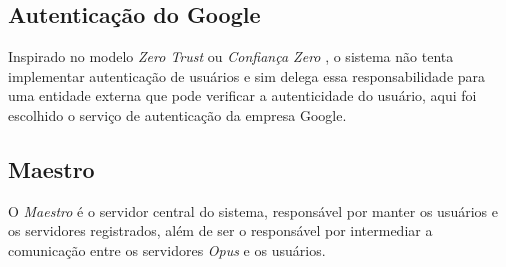 \subsection{Autenticação do Google}
\label{arq-subsubsec:internet-autenticacao-google}
Inspirado no modelo \emph{Zero Trust} ou \emph{Confiança Zero} \cite{Kang2023}, o sistema não tenta implementar autenticação de usuários
e sim delega essa responsabilidade para uma entidade externa que pode verificar a autenticidade do usuário, 
aqui foi escolhido o serviço de autenticação da empresa Google.

\subsection{Maestro}
\label{arq-subsubsec:internet-maestro}
O \emph{Maestro} é o servidor central do sistema, responsável por manter os usuários e os servidores registrados,
além de ser o responsável por intermediar a comunicação entre os servidores \emph{Opus} e os usuários.
